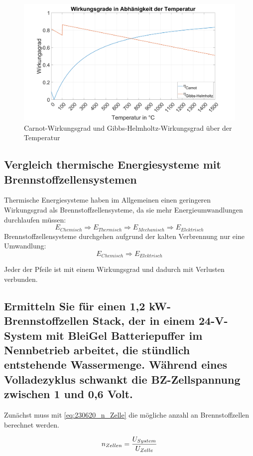 \begin{figure}[H]
    \centering
    \includegraphics[width=\textwidth]{Abbildungen/Wirkungsgrade.png}
    \caption{Carnot-Wirkungsgrad und Gibbs-Helmholtz-Wirkungsgrad über der Temperatur}
    \label{fig:230620_Wirkungsgrade}
\end{figure}

\subsection{Vergleich thermische Energiesysteme mit Brennstoffzellensystemen}

Thermische Energiesysteme haben im Allgemeinen einen geringeren Wirkungsgrad als Brennstoffzellensysteme, da sie  mehr Energieumwandlungen durchlaufen müssen:
$$E_{Chemisch} \Rightarrow E_{Thermisch} \Rightarrow E_{Mechanisch} \Rightarrow E_{Elektrisch}$$ 
Brennstoffzellensysteme durchgehen aufgrund der kalten Verbrennung nur eine Umwandlung:
$$E_{Chemisch} \Rightarrow E_{Elektrisch}$$

Jeder der Pfeile ist mit einem Wirkungsgrad und dadurch mit Verlusten verbunden.

\subsection{Ermitteln Sie für einen 1,2 kW-Brennstoffzellen Stack, der in einem 24-V-System mit
BleiGel Batteriepuffer im Nennbetrieb arbeitet, die stündlich entstehende Wassermenge.
Während eines Volladezyklus schwankt die BZ-Zellspannung zwischen 1 und 0,6 Volt.}
\label{sec:VF_H2O_Menge}

Zunächst muss mit \autoref{eq:230620_n_Zelle} die mögliche anzahl an Brennstoffzellen berechnet werden.

\begin{equation}
    n_{Zellen} = \frac{U_{System}}{U_{Zelle}}\\
    \label{eq:230620_n_Zelle}
\end{equation}

